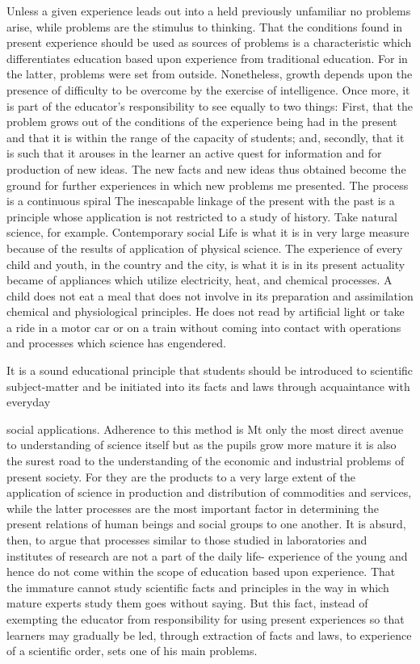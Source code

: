 Unless a given experience leads out into a held previously unfamiliar no problems 
arise, while problems are the stimulus to thinking. That the conditions found in present 
experience should be used as sources of problems is a characteristic which differentiates 
education based upon experience from traditional education. For in the latter, problems 
were set from outside. Nonetheless, growth depends upon the presence of difficulty to be 
overcome by the exercise of intelligence. Once more, it is part of the educator's 
responsibility to see equally to two things: First, that the problem grows out of the 
conditions of the experience being had in the present and that it is within the range of the 
capacity of students; and, secondly, that it is such that it arouses in the learner an active 
quest for information and for production of new ideas. The new facts and new ideas thus 
obtained become the ground for further experiences in which new problems me 
presented. The process is a continuous spiral The inescapable linkage of the present with 
the past is a principle whose application is not restricted to a study of history. Take 
natural science, for example. Contemporary social Life is what it is in very large measure 
because of the results of application of physical science. The experience of every child 
and youth, in the country and the city, is what it is in its present actuality became of 
appliances which utilize electricity, heat, and chemical processes. A child does not eat a 
meal that does not involve in its preparation and assimilation chemical and physiological 
principles. He does not read by artificial light or take a ride in a motor car or on a train 
without coming into contact with operations and processes which science has 
engendered. 

It is a sound educational principle that students should be introduced to scientific 
subject-matter and be initiated into its facts and laws through acquaintance with everyday 



social applications. Adherence to this method is Mt only the most direct avenue to 
understanding of science itself but as the pupils grow more mature it is also the surest 
road to the understanding of the economic and industrial problems of present society. For 
they are the products to a very large extent of the application of science in production and 
distribution of commodities and services, while the latter processes are the most 
important factor in determining the present relations of human beings and social groups 
to one another. It is absurd, then, to argue that processes similar to those studied in 
laboratories and institutes of research are not a part of the daily life- experience of the 
young and hence do not come within the scope of education based upon experience. That 
the immature cannot study scientific facts and principles in the way in which mature 
experts study them goes without saying. But this fact, instead of exempting the educator 
from responsibility for using present experiences so that learners may gradually be led, 
through extraction of facts and laws, to experience of a scientific order, sets one of his 
main problems. 

